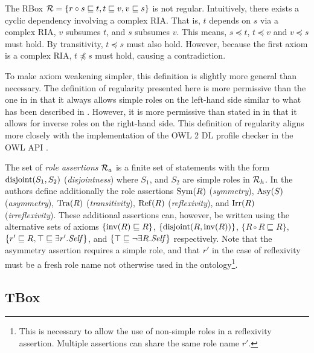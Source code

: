 \begin{example}
  The RBox $\mathcal{R} = \{ r \circ s \sqsubseteq t, t \sqsubseteq v, v \sqsubseteq s \}$ is not regular. Intuitively, there exists a cyclic dependency involving a complex RIA. That is, $t$ depends on $s$ via a complex RIA, $v$ subsumes $t$, and $s$ subsumes $v$. This means, $s \preceq t$, $t \preceq v$ and $v \preceq s$ must hold. By transitivity, $t \preceq s$ must also hold. However, because the first axiom is a complex RIA, $t \not\preceq s$ must hold, causing a contradiction.
\end{example}

To make axiom weakening simpler, this definition is slightly more general than necessary. The definition of regularity presented here is more permissive than the one in \cite{horrocks2006even} in that it always allows simple roles on the left-hand side similar to what has been described in \cite{rudolph2011foundations}. However, it is more permissive than stated in \cite{rudolph2011foundations} in that it allows for inverse roles on the right-hand side. This definition of regularity aligns more closely with the implementation of the OWL 2 DL \cite{motik2012ontology} profile checker in the OWL API \cite{horridge2011owl,owlapi}.

The set of \emph{role assertions} $\mathcal{R}_a$ is a finite set of statements with the form $\operatorname{disjoint}(S_1, S_2)$ (\emph{disjointness}) where $S_1$, and $S_2$ are simple roles in $\mathcal{R}_h$. In \cite{horrocks2006even} the authors define additionally the role assertions $\operatorname{Sym}(R)$ (\emph{symmetry}), $\operatorname{Asy}(S)$ (\emph{asymmetry}), $\operatorname{Tra}(R)$ (\emph{transitivity}), $\operatorname{Ref}(R)$ (\emph{reflexivity}), and $\operatorname{Irr}(R)$ (\emph{irreflexivity}). These additional assertions can, however, be written using the alternative sets of axioms $\{ \operatorname{inv}(R) \sqsubseteq R \}$, $\{ \operatorname{disjoint}(R, \operatorname{inv}(R)) \}$, $\{ R \circ R \sqsubseteq R \}$, $\{ r' \sqsubseteq R , \top \sqsubseteq \exists r'.\mathit{Self} \}$, and $\{ \top \sqsubseteq \lnot \exists R.\mathit{Self} \}$ respectively. Note that the asymmetry assertion requires a simple role, and that $r'$ in the case of reflexivity must be a fresh role name not otherwise used in the ontology\footnote{This is necessary to allow the use of non-simple roles in a reflexivity assertion. Multiple assertions can share the same role name $r'$.}.

\subsection{TBox} \label{tbox}

